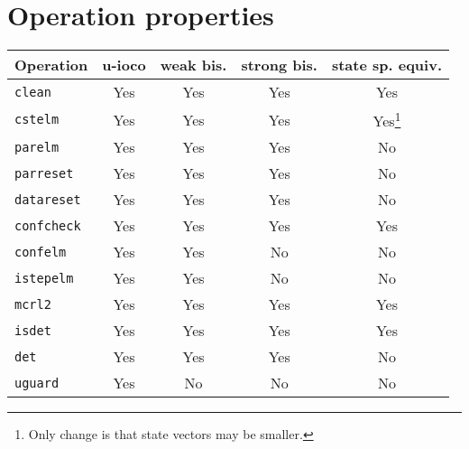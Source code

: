 \section{Operation properties}

\begin{tabularx}{\linewidth}{X|c|c|c|c|}
\textbf{Operation} & \textbf{u-ioco} & \textbf{weak bis.} & \textbf{strong bis.} & \textbf{state sp. equiv.} \\ \hline
\texttt{clean} & Yes & Yes & Yes & Yes \\ \hline
\texttt{cstelm} & Yes & Yes & Yes & Yes\footnote{\label{statevectors}Only change is that state vectors may be smaller.} \\ \hline
\texttt{parelm} & Yes & Yes & Yes & No \\ \hline
\texttt{parreset} & Yes & Yes & Yes & No \\ \hline
\texttt{datareset} & Yes & Yes & Yes & No \\ \hline
\texttt{confcheck} & Yes & Yes & Yes & Yes \\ \hline
\texttt{confelm} & Yes & Yes & No & No \\ \hline
\texttt{istepelm} & Yes & Yes & No & No \\ \hline
\texttt{mcrl2} & Yes & Yes & Yes & Yes \\ \hline
\texttt{isdet} & Yes & Yes & Yes & Yes \\ \hline
\texttt{det} & Yes & Yes & Yes & No \\ \hline
\texttt{uguard} & Yes & No & No & No \\ \hline
\end{tabularx}

